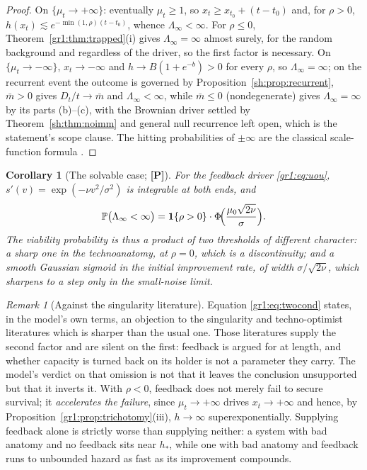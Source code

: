 \documentclass[11pt]{article}
\numberwithin{equation}{section}
\theoremstyle{plain}
\newtheorem{corollary}[theorem]{Corollary}
\theoremstyle{definition}
\theoremstyle{remark}
\newtheorem{remark}[theorem]{Remark}
\newcommand{\PP}{\mathbb{P}}
\newcommand{\one}{\mathbf{1}}
\begin{document}
\begin{proof}
On $\{\mu_t\to+\infty\}$: eventually $\mu_t\ge1$, so $x_t\ge x_{t_0}+
(t-t_0)$ and, for $\rho>0$, $h(x_t)\lesssim e^{-\min(1,\rho)(t-t_0)}$,
whence $\Lambda_\infty<\infty$. For $\rho\le0$,
Theorem~\ref{gr1:thm:trapped}(i) gives $\Lambda_\infty=\infty$ almost
surely, for the random background and regardless of the driver, so
the first factor is necessary. On
$\{\mu_t\to-\infty\}$, $x_t\to-\infty$ and $h\to B(1+e^{-b})>0$ for
every $\rho$, so $\Lambda_\infty=\infty$; on the recurrent event the
outcome is governed by Proposition~\ref{sh:prop:recurrent}, $\bar m>0$ gives $D_t/t\to\bar m$ and $\Lambda_\infty<\infty$, while
$\bar m\le0$ (nondegenerate) gives $\Lambda_\infty=\infty$ by its
parts (b)--(c), with the Brownian driver settled by
Theorem~\ref{sh:thm:noimm} and general null recurrence left open,
which is the statement's scope clause. The hitting
probabilities of $\pm\infty$ are the classical scale-function formula
\cite{KT81,RY99}.
\end{proof}

\begin{corollary}[The solvable case; \textbf{[P]}]\label{gr1:cor:solvable}
For the feedback driver \eqref{gr1:eq:uou},
$s'(v)=\exp(-\nu v^{2}/\sigma^{2})$ is integrable at both ends, and
\begin{equation}\label{gr1:eq:sigmoid}
\PP\bigl(\Lambda_\infty<\infty\bigr)
=\one\{\rho>0\}\cdot\Phi\!\Bigl(\frac{\mu_0\sqrt{2\nu}}{\sigma}\Bigr).
\end{equation}
The viability probability is thus a \emph{product of two thresholds of
different character}: a sharp one in the technoanatomy, at $\rho=0$,
which is a discontinuity; and a smooth Gaussian sigmoid in the initial
improvement rate, of width $\sigma/\sqrt{2\nu}$, which sharpens to a
step only in the small-noise limit.
\end{corollary}

\begin{remark}[Against the singularity literature]
\label{gr1:rem:againstsing}
Equation \eqref{gr1:eq:twocond} states, in the model's own terms, an
objection to the singularity and techno-optimist literatures which is
sharper than the usual one. Those literatures supply
the second factor and are silent on the first: feedback is argued for at
length, and whether capacity is turned back on its holder is not a
parameter they carry. The model's verdict on that omission is not that
it leaves the conclusion unsupported but that it inverts it. With
$\rho<0$, feedback does not merely fail to secure survival; it
\emph{accelerates the failure}, since $\mu_t\to+\infty$ drives
$x_t\to+\infty$ and hence, by
Proposition~\ref{gr1:prop:trichotomy}(iii), $h\to\infty$
superexponentially. Supplying feedback alone is strictly worse than
supplying neither: a system with bad anatomy and no feedback sits near
$h_\ast$, while one with bad anatomy and feedback runs to unbounded
hazard as fast as its improvement compounds.
\end{remark}
\end{document}
